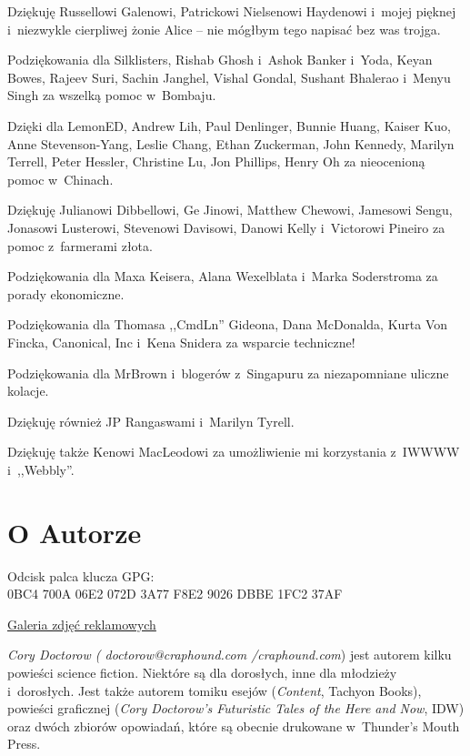 \documentclass[oneside,polish,11pt,rmheadings]{mwbk}
\begin{document}
Dziękuję Russellowi Galenowi, Patrickowi Nielsenowi Haydenowi i~mojej pięknej i~niezwykle cierpliwej żonie Alice -- nie mógłbym tego napisać bez was trojga. 


Podziękowania dla Silklisters, Rishab Ghosh i~Ashok Banker i~Yoda, Keyan Bowes, Rajeev Suri, Sachin Janghel, Vishal Gondal, Sushant Bhalerao i~Menyu Singh za wszelką pomoc w~Bombaju. 


Dzięki dla LemonED, Andrew Lih, Paul Denlinger, Bunnie Huang, Kaiser Kuo, Anne Stevenson-Yang, Leslie Chang, Ethan Zuckerman, John Kennedy, Marilyn Terrell, Peter Hessler, Christine Lu, Jon Phillips, Henry Oh za nieocenioną pomoc w~Chinach. 


Dziękuję Julianowi Dibbellowi, Ge Jinowi, Matthew Chewowi, Jamesowi Sengu, Jonasowi Lusterowi, Stevenowi Davisowi, Danowi Kelly i~Victorowi Pineiro za pomoc z~farmerami złota. 


Podziękowania dla Maxa Keisera, Alana Wexelblata i~Marka Soderstroma za porady ekonomiczne. 


Podziękowania dla Thomasa ,,CmdLn'' Gideona, Dana McDonalda, Kurta Von Fincka, Canonical, Inc i~Kena Snidera za wsparcie techniczne! 


Podziękowania dla MrBrown i~blogerów z~Singapuru za niezapomniane uliczne kolacje. 


Dziękuję również JP Rangaswami i~Marilyn Tyrell. 


Dziękuję także Kenowi MacLeodowi za umożliwienie mi korzystania z~IWWWW i~,,Webbly''. 

\clearpage 


\chapter*{O Autorze}

Odcisk palca klucza GPG: \\ 0BC4 700A 06E2 072D 3A77 F8E2 9026 DBBE 1FC2 37AF 

\href{https://www.flickr.com/photos/doctorow/sets/72157622138315932/}{Galeria zdjęć reklamowych} 


\textit{Cory Doctorow ( doctorow@craphound.com /\textit{\textit{craphound.com}}}) jest autorem kilku powieści science fiction. Niektóre są dla dorosłych, inne dla młodzieży i~dorosłych. Jest także autorem tomiku esejów (\textit{Content}, Tachyon Books), powieści graficznej (\textit{Cory Doctorow's Futuristic Tales of the Here and Now}, IDW) oraz dwóch zbiorów opowiadań, które są obecnie drukowane w~Thunder's Mouth Press.
\end{document}
